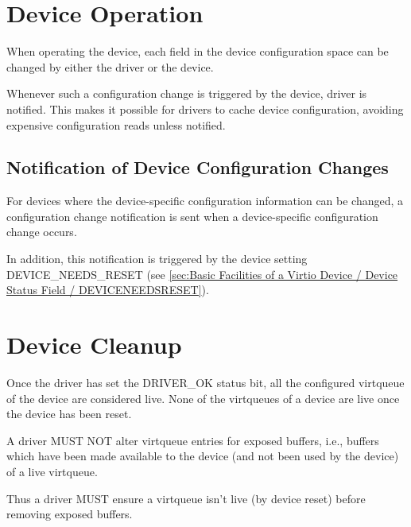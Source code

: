 \section{Device Operation}\label{sec:General Initialization And Device Operation / Device Operation}

When operating the device, each field in the device configuration
space can be changed by either the driver or the device.

Whenever such a configuration change is triggered by the device,
driver is notified. This makes it possible for drivers to
cache device configuration, avoiding expensive configuration
reads unless notified.


\subsection{Notification of Device Configuration Changes}\label{sec:General Initialization And Device Operation / Device Operation / Notification of Device Configuration Changes}

For devices where the device-specific configuration information can be
changed, a configuration change notification is sent when a
device-specific configuration change occurs.

In addition, this notification is triggered by the device setting
DEVICE_NEEDS_RESET (see \ref{sec:Basic Facilities of a Virtio Device / Device Status Field / DEVICENEEDSRESET}).

\section{Device Cleanup}\label{sec:General Initialization And Device Operation / Device Cleanup}

Once the driver has set the DRIVER_OK status bit, all the configured
virtqueue of the device are considered live.  None of the virtqueues
of a device are live once the device has been reset.


A driver MUST NOT alter virtqueue entries for exposed buffers,
i.e., buffers which have been
made available to the device (and not been used by the device)
of a live virtqueue.

Thus a driver MUST ensure a virtqueue isn't live (by device reset) before removing exposed buffers.

